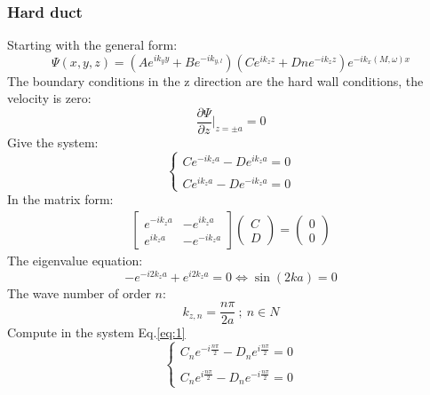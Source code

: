 \subsubsection*{Hard duct}\label{sec:EigenvalueHard}
Starting with the general form:
\begin{equation}
        \Psi(x,y,z)=(Ae^{ik_{y}y}+Be^{-ik_{y,l}})(Ce^{ik_{z}z}+Dne^{-ik_{z}z})e^{-ik_{x}(M,\omega)x}
\end{equation}
The boundary conditions in the z direction are the hard wall conditions, the velocity is zero:  
\begin{equation}
    \frac{\partial\Psi}{\partial z} \Bigg|_{z=\pm a}=0
\end{equation}
Give the system:
\begin{equation}\label{eq:1}
    \left\{
    \begin{array}{ll}
    Ce^{-ik_za}-De^{ik_za}=0\\
        \\
    Ce^{ik_za}-De^{-ik_za}=0   
    \end{array}
    \right.
\end{equation}
In the matrix form: 
\begin{gather}
    \begin{bmatrix}
      e^{-ik_za} & -e^{ik_za} \\
      e^{ik_za} & -e^{-ik_za}
    \end{bmatrix}
    \begin{pmatrix}
       C\\
       D
    \end{pmatrix}
    =
    \begin{pmatrix}
      0\\
      0
    \end{pmatrix}
\end{gather}
The eigenvalue equation:
\begin{equation}
    -e^{-i2k_za}+e^{i2k_za}=0 \iff \sin(2ka)=0
\end{equation}
The wave number of order $n$:
\begin{equation}
    k_{z,n}=\frac{n\pi}{2a} \ ; \ n\in N
\end{equation}
Compute in the system Eq.\eqref{eq:1}
\begin{equation}
    \left\{
    \begin{array}{ll}
    C_ne^{-i\frac{n\pi}{2}}-D_ne^{i\frac{n\pi}{2}}=0\\
        \\
    C_ne^{i\frac{n\pi}{2}}-D_ne^{-i\frac{n\pi}{2}}=0   
    \end{array}
    \right.
\end{equation}
